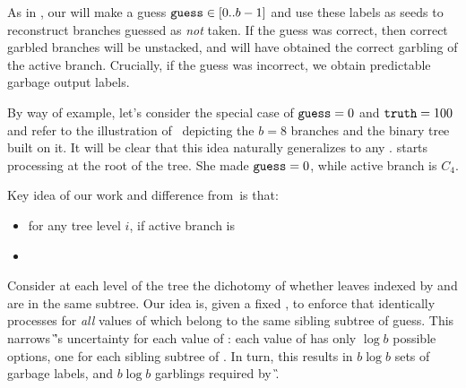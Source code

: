  As in \HK, our \E will make a guess $\mathtt{guess}\in[0..b-1]$ and use these labels as seeds to reconstruct branches guessed as {\em not} taken.  If the guess was correct, then correct garbled branches will be unstacked, and \E will have obtained the correct garbling of the active branch.  Crucially, if the guess was incorrect, we obtain predictable garbage output labels.



By way of example, let's consider the special case of $\mathtt{guess}=0$ and $\mathtt{truth} = 100$ and refer to the illustration of~ depicting the $b=8$ branches and the binary tree built on it.  It will be clear that this idea naturally generalizes to any \guess.  \E starts processing at the root of the tree.  She made $\mathtt{guess} = 0$, while active branch is $C_4$.  



 Key idea of our work and difference from~\HK is that:
\begin{itemize}
	\item for any tree level $i$, if active branch is 
	\item 
\end{itemize}




 Consider at each level of the tree the dichotomy of whether leaves indexed by \guess and \truth are in the same subtree. Our idea is, given a fixed \guess, to  enforce that \E identically processes \guess for {\em all} values of \truth which belong to the same sibling subtree of guess. This narrows \G’s uncertainty for each value of \guess: each value of \guess has only $\log b$ possible \truth options, one for each sibling subtree of \guess.  In turn, this results in $b\log b$  sets of garbage labels, and $b\log b$ garblings required by \G. 


\medskip



